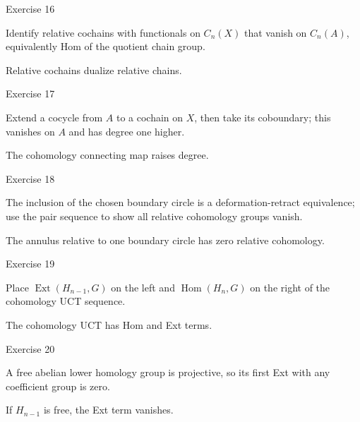 \begin{exercise}\label{exr:viii28-16}
Exercise 16
\end{exercise}
\begin{hint}
Identify relative cochains with functionals on \(C_n(X)\) that vanish on \(C_n(A)\), equivalently Hom of the quotient chain group.
\end{hint}
\begin{solution}
Relative cochains dualize relative chains.
\end{solution}

\begin{exercise}\label{exr:viii28-17}
Exercise 17
\end{exercise}
\begin{hint}
Extend a cocycle from \(A\) to a cochain on \(X\), then take its coboundary; this vanishes on \(A\) and has degree one higher.
\end{hint}
\begin{solution}
The cohomology connecting map raises degree.
\end{solution}

\begin{exercise}\label{exr:viii28-18}
Exercise 18
\end{exercise}
\begin{hint}
The inclusion of the chosen boundary circle is a deformation-retract equivalence; use the pair sequence to show all relative cohomology groups vanish.
\end{hint}
\begin{solution}
The annulus relative to one boundary circle has zero relative cohomology.
\end{solution}

\begin{exercise}\label{exr:viii28-19}
Exercise 19
\end{exercise}
\begin{hint}
Place \(\operatorname{Ext}(H_{n-1},G)\) on the left and \(\operatorname{Hom}(H_n,G)\) on the right of the cohomology UCT sequence.
\end{hint}
\begin{solution}
The cohomology UCT has Hom and Ext terms.
\end{solution}

\begin{exercise}\label{exr:viii28-20}
Exercise 20
\end{exercise}
\begin{hint}
A free abelian lower homology group is projective, so its first Ext with any coefficient group is zero.
\end{hint}
\begin{solution}
If \(H_{n-1}\) is free, the Ext term vanishes.
\end{solution}

